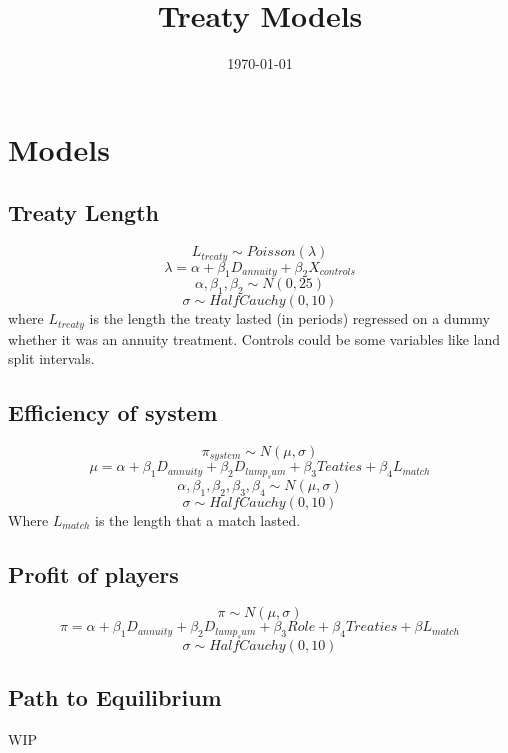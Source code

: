 \documentclass[12pt]{article} %
\let\oldfootnote\footnote
\renewcommand\footnote[1]{%
	\oldfootnote{\hspace{1.5mm}#1}}
\let\ACMmaketitle=\maketitle
\renewcommand{\maketitle}{\begingroup\let\footnote=\thanks \ACMmaketitle\endgroup}
\begin{document}
\title{Treaty Models}
\date{\today}
\maketitle

\section{Models}
\subsection{Treaty Length}
	$$L_{treaty} \sim  Poisson(\lambda)$$
	$$ \lambda = \alpha+\beta_1 D_{annuity} + \beta_2 X_{controls}$$
	$$\alpha, \beta_1, \beta_2 \sim  N(0, 25)$$
	$$\sigma \sim  HalfCauchy(0,10)$$
where $L_{treaty}$ is the length the treaty lasted (in periods) regressed on a dummy whether it was an annuity treatment. Controls could be some variables like land split intervals.
\subsection{Efficiency of system}
$$\pi_{system} \sim  N(\mu, \sigma)$$
$$ \mu = \alpha + \beta_1D_{annuity} + \beta_2D_{lump_sum} + \beta_3Teaties + \beta_4L_{match}$$
$$\alpha, \beta_1, \beta_2, \beta_3, \beta_4 \sim  N(\mu, \sigma)$$
$$\sigma \sim  HalfCauchy(0,10)$$
Where $L_{match}$ is the length that a match lasted.
\subsection{Profit of players}
$$\pi \sim  N(\mu, \sigma)$$
$$\pi = \alpha+\beta_1 D_{annuity} + \beta_2D_{lump_sum} +\beta_3Role + \beta_4Treaties + \beta L_{match}$$
$$\sigma \sim  HalfCauchy(0,10)$$
\subsection{Path to Equilibrium}
WIP
\end{document}
